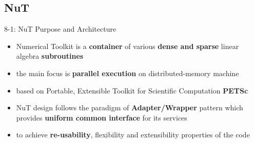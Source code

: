 \subsection{NuT}

\ifSpeech
\begin{frame}[t]{8-1: NuT Purpose and Architecture}
    \spc
    \justifying
    
    \begin{itemize}
        \setlength\itemsep{0.25cm}
        \item Numerical Toolkit is a \textbf{container} of various \textbf{dense and sparse} linear algebra \textbf{subroutines}
        
        \item the main focus is \textbf{parallel execution} on distributed-memory machine
        
        \item based on Portable, Extensible Toolkit for Scientific Computation \textbf{PETSc}
        
        \item NuT design follows the paradigm of \textbf{Adapter/Wrapper} pattern which provides \textbf{uniform common interface} for its services 
        
        \item to achieve \textbf{re-usability}, flexibility and extensibility properties of the code
    \end{itemize}

\end{frame}
\fi




